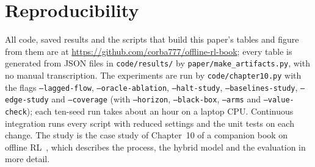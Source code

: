\documentclass[11pt]{article}
\begin{document}
\section{Reproducibility}

All code, saved results and the scripts that build this paper's tables and figure from them are at \url{https://github.com/corba777/offline-rl-book}; every table is generated from JSON files in \texttt{code/results/} by \texttt{paper/make\_artifacts.py}, with no manual transcription. The experiments are run by \texttt{code/chapter10.py} with the flags \texttt{--lagged-flow}, \texttt{--oracle-ablation}, \texttt{--halt-study}, \texttt{--baselines-study}, \texttt{--edge-study} and \texttt{--coverage} (with \texttt{--horizon}, \texttt{--black-box}, \texttt{--arms} and \texttt{--value-check}); each ten-seed run takes about an hour on a laptop CPU. Continuous integration runs every script with reduced settings and the unit tests on each change. The study is the case study of Chapter~10 of a companion book on offline RL~\citep{zvyagintsev2026book}, which describes the process, the hybrid model and the evaluation in more detail.



\end{document}
